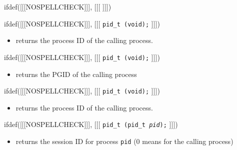 
ifdef([[[NOSPELLCHECK]]], [[[
]]])

\begin{slide}
ifdef([[[NOSPELLCHECK]]], [[[
\texttt{pid\_t (void);}
]]])
\begin{itemize}
\item returns the process ID of the calling process.
\end{itemize}
ifdef([[[NOSPELLCHECK]]], [[[
\texttt{pid\_t (void);}
]]])
\begin{itemize}
\item returns the PGID of the calling process
\end{itemize}
ifdef([[[NOSPELLCHECK]]], [[[
\texttt{pid\_t (void);} 
]]])
\begin{itemize}
\item returns the process ID of the calling process.
\end{itemize}
ifdef([[[NOSPELLCHECK]]], [[[
\texttt{pid\_t (pid\_t \emph{pid});}
]]])
\begin{itemize}
\item returns the session ID for process \texttt{pid} (0 means for the calling
process)
\end{itemize}
\end{slide}

